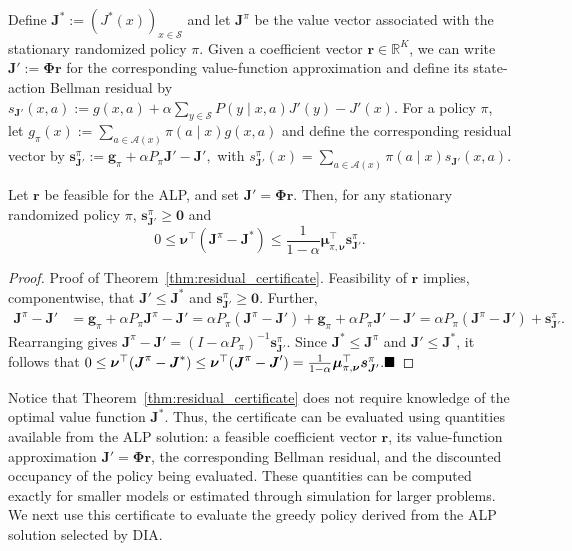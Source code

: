 \documentclass[sglanonrev]{informs4}
\providecommand{\bJ}{\boldsymbol{J}}
\providecommand{\bPhi}{\boldsymbol{\Phi}}
\providecommand{\bg}{\boldsymbol{g}}
\providecommand{\bmu}{\boldsymbol{\mu}}
\providecommand{\bnu}{\boldsymbol{\nu}}
\providecommand{\br}{\boldsymbol{r}}
\providecommand{\bzero}{\boldsymbol{0}}
\def\edits#1{{\color{black}#1}}
\begin{document}
\edits{Define $\bJ^*:=(J^*(x))_{x\in\mathcal S}$ and 
let $\bJ^\pi$ be the value vector associated with the stationary randomized policy $\pi$. Given a coefficient vector $\br\in\mathbb R^K$, we can write $\bJ':=\bPhi\br$ for the corresponding value-function approximation and define its state-action Bellman residual by}
$
s_{\bJ'}(x,a)
:=
g(x,a)+\alpha\sum_{y\in\mathcal S}P(y\mid x,a)J'(y)
-J'(x).
$
For a policy $\pi$, let
$g_\pi(x):=\sum_{a\in\mathcal A(x)}\pi(a\mid x)g(x,a)$ and define
the corresponding residual vector by
$
\boldsymbol s_{\bJ'}^\pi
:=
\bg_\pi+\alpha P_\pi\bJ'-\bJ',
$
with
$
s_{\bJ'}^\pi(x)
=
\sum_{a\in\mathcal A(x)}\pi(a\mid x)
s_{\bJ'}(x,a).
$
\begin{theorem}
\label{thm:residual_certificate}
Let $\br$ be feasible for the \ac{ALP}, and set $\bJ'=\bPhi\br$.
Then, for any stationary randomized policy $\pi$,
$\boldsymbol s_{\bJ'}^\pi\geq\bzero$ and
\begin{equation}
\label{eq:residual_loss_certificate}
0
\leq
\bnu^\top(\bJ^\pi-\bJ^*)
\leq
\frac{1}{1-\alpha}
\bmu_{\pi,\bnu}^\top
\boldsymbol s_{\bJ'}^\pi.
\end{equation}
\end{theorem}

\begin{proof}{Proof of Theorem~\ref{thm:residual_certificate}.}
Feasibility of $\br$ implies, componentwise, that
$\bJ'\leq\bJ^*$ and
$\boldsymbol s_{\bJ'}^\pi\geq\bzero$. Further,
\[
\begin{aligned}
\bJ^\pi-\bJ'
&=\bg_\pi+\alpha P_\pi\bJ^\pi-\bJ'
=\alpha P_\pi(\bJ^\pi-\bJ')
  +\bg_\pi+\alpha P_\pi\bJ'-\bJ'
=\alpha P_\pi(\bJ^\pi-\bJ')
  +\boldsymbol s_{\bJ'}^\pi.
\end{aligned}
\]
Rearranging gives
$\bJ^\pi-\bJ'
=(I-\alpha P_\pi)^{-1}
\boldsymbol s_{\bJ'}^\pi.$
Since $\bJ^*\le\bJ^\pi$ and $\bJ'\le\bJ^*$, it follows that
$0\le\bnu^\top(\bJ^\pi-\bJ^*)
\le\bnu^\top(\bJ^\pi-\bJ')
=\frac{1}{1-\alpha}\bmu_{\pi,\bnu}^\top
\boldsymbol s_{\bJ'}^\pi.
\hfill\blacksquare$
\end{proof}

\smallskip
\edits{Notice that Theorem~\ref{thm:residual_certificate} does not require knowledge of the optimal value function $\bJ^*$. Thus, the certificate can be evaluated using quantities available from the \ac{ALP} solution: a feasible coefficient vector $\br$, its value-function approximation $\bJ'=\bPhi\br$, the corresponding Bellman residual, and the discounted occupancy of the policy being evaluated. These quantities can be computed exactly for smaller models or estimated through simulation for larger problems. We next use this certificate to evaluate the greedy policy derived from the \ac{ALP} solution selected by \ac{DIA}.}
\end{document}
